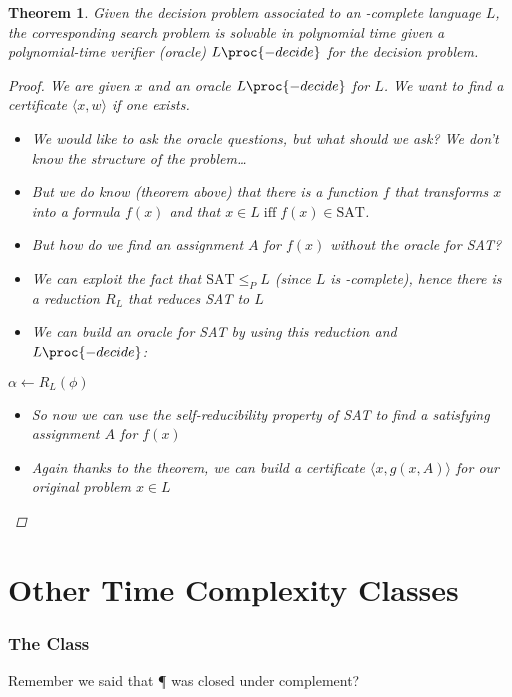 \documentclass[a4paper]{report}
\newtheorem{theo}{Theorem}
\newcommand{\bookref}[3]{\marginpar{\faBook{}~#1\\Chapter #2\\Section #3}}
\theoremstyle{definition}
\begin{document}
\begin{theo}
Given the decision problem associated to an \NP-complete language $L$, the corresponding search problem is solvable in polynomial time given a polynomial-time verifier (oracle) $L\proc{-decide}$ for the decision problem.
\begin{proof}
We are given $x$ and an oracle $L\proc{-decide}$ for $L$. We want to find a certificate $\langle x, w \rangle$ if one exists.
\begin{itemize}
\item We would like to ask the oracle questions, but what should we ask? We don't know the structure of the problem\dots{}
\item But we do know (theorem above) that there is a function $f$ that transforms $x$ into a formula $f(x)$ and that $x \in L \;\text{iff}\; f(x) \in \text{SAT}$.
\item But how do we find an assignment $A$ for $f(x)$ without the oracle for SAT?
\item We can exploit the fact that $\text{SAT} \leq_P L$ (since $L$ is \NP-complete), hence there is a reduction $R_L$ that reduces SAT to $L$
\item We can build an oracle for SAT by using this reduction and $L\proc{-decide}$:
\end{itemize}
\begin{codebox}
\li $\alpha \gets R_L(\phi)$
\li {}
\end{codebox}
\begin{itemize}
\item So now we can use the self-reducibility property of SAT to find a satisfying assignment $A$ for $f(x)$
\item Again thanks to the theorem, we can build a certificate $\langle x, g(x, A) \rangle$ for our original problem $x \in L$
\end{itemize}
\end{proof}
\end{theo}

\part{Other Time Complexity Classes}

\section{The Class \coNP}
\bookref{ER}{28}{28.8}
Remember we said that \P{} was closed under complement?
\end{document}
